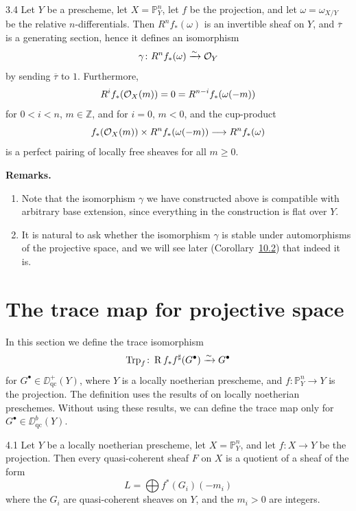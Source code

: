 \begin{booktheorem}{3.4}\label{thm:3.3.4}
\cite[\nopp III,~2.1.12]{EGA} Let $Y$ be a prescheme, let $X=\mathbb{P}^n_Y$, let $f$ be the projection, and let $\omega=\omega_{X/Y}$ be the relative $n$-differentials. Then $R^n f_*(\omega)$ is an invertible sheaf on $Y$, and $\overline{\tau}$ is a generating section, hence it defines an isomorphism
\[
\gamma\colon R^n f_*(\omega) \xrightarrow{\sim} \mathcal{O}_Y
\]
by sending $\overline{\tau}$ to $1$. Furthermore,
\[
R^i f_*(\mathcal{O}_X(m)) = 0 = R^{n-i}f_*(\omega(-m))
\]
for $0<i<n$, $m\in\mathbb{Z}$, and for $i=0$, $m<0$, and the cup-product
\[
f_*(\mathcal{O}_X(m)) \times R^n f_*(\omega(-m)) \longrightarrow R^n f_*(\omega)
\]
is a perfect pairing of locally free sheaves for all $m\ge 0$.
\end{booktheorem}

\textbf{Remarks.}
\begin{enumerate}
\item Note that the isomorphism $\gamma$ we have constructed above is compatible with arbitrary base extension, since everything in the construction is flat over $Y$.
\item It is natural to ask whether the isomorphism $\gamma$ is stable under automorphisms of the projective space, and we will see later (Corollary~\hyperref[cor:3.10.2]{10.2}) that indeed it is.
\end{enumerate}
\section{The trace map for projective space}\label{sec:3.4}

In this section we define the trace isomorphism
\[
\operatorname{Trp}_f \colon \operatorname{R} f_* f^{\sharp}(G^\bullet) \xrightarrow{\sim} G^\bullet
\]
for $G^\bullet\in\DD_{\mathrm{qc}}^+(Y)$, where $Y$ is a locally noetherian prescheme, and $f\colon\mathbb{P}^n_Y\to Y$ is the projection. The definition uses the results of  on locally noetherian preschemes. Without using these results, we can define the trace map only for $G^\bullet\in\DD_{\mathrm{qc}}^b(Y)$.

\begin{booklemma}{4.1}\label{lem:3.4.1}
Let $Y$ be a locally noetherian prescheme, let $X=\mathbb{P}_Y^n$, and let $f\colon X\to Y$ be the projection. Then every quasi-coherent sheaf $F$ on $X$ is a quotient of a sheaf of the form
\[
L = \bigoplus f^*(G_i)(-m_i)
\]
where the $G_i$ are quasi-coherent sheaves on $Y$, and the $m_i>0$ are integers.
\end{booklemma}

